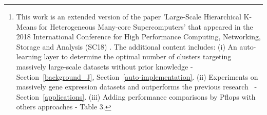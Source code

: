 \documentclass[10pt,journal,compsoc]{IEEEtran}
\begin{document}
\author{Teng Yu,
        Wenlai Zhao,
        Pan Liu,
        Shicai Wang,
        Xiaohan Yan, \\
        Vladimir Janjic,
        Haohuan Fu,
        John Thomson
\thanks{This work is an extended version of the paper 'Large-Scale Hierarchical K-Means for Heterogeneous Many-core Supercomputers' that appeared in the 2018 International Conference for High Performance Computing, Networking, Storage and Analysis (SC18) \cite{li2018large}. The additional content includes: 
(i) An auto-learning layer to determine the optimal number of clusters targeting massively large-scale datasets without prior knowledge - Section~\ref{background_J}, Section~\ref{auto-implementation}.
(ii) Experiments on massively gene expression datasets and outperforms the previous research~\cite{wang2014optimising} - Section~\ref{applications}. 
(iii) Adding performance comparisons by Pflops with others approaches - Table 3. 
}  

\IEEEcompsocitemizethanks
{\IEEEcompsocthanksitem T.Yu, V.Janjic and J.Thomson with University of St Andrews, UK.\protect\\
E-mail: \{ty33,vj32,j.thomson\}@st-andrews.ac.uk
\IEEEcompsocthanksitem W.Zhao, P.Liu and H.Fu with Tsinghua University and National Supercomputer Centre in Wuxi, China. W.Zhao is the corresponding author.\protect\\
E-mail:
\IEEEcompsocthanksitem S.Wang is with Sanger Institute, UK.\protect\\
E-mail: s.wang11@alumni.imperial.ac.uk
\IEEEcompsocthanksitem X.Yan is with University of California, Berkeley, US.\protect\\
E-mail: xiaohan\_yan@berkeley.edu
}%
}

% 
%
\end{document}
